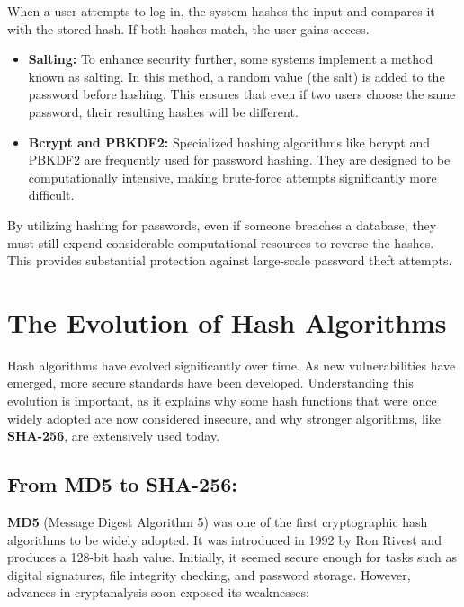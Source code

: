 \documentclass[11pt,a4paper]{article}
\begin{document}
    When a user attempts to log in, the system hashes the input and compares it with the stored hash. If both hashes match, the user gains access.
        \begin{itemize}
            \item \textbf{Salting:} To enhance security further, some systems implement a method known as salting. In this method, a random value (the salt) is added to the password before hashing. This ensures that even if two users choose the same password, their resulting hashes will be different.

            \item \textbf{Bcrypt and PBKDF2:} Specialized hashing algorithms like bcrypt and PBKDF2 are frequently used for password hashing. They are designed to be computationally intensive, making brute-force attempts significantly more difficult.

        \end{itemize}
        By utilizing hashing for passwords, even if someone breaches a database, they must still expend considerable computational resources to reverse the hashes. This provides substantial protection against large-scale password theft attempts.

\section*{The Evolution of Hash Algorithms}
Hash algorithms have evolved significantly over time. As new vulnerabilities have emerged, more secure standards have been developed. Understanding this evolution is important, as it explains why some hash functions that were once widely adopted are now considered insecure, and why stronger algorithms, like \textbf{SHA-256}, are extensively used today.

    \subsection*{From MD5 to SHA-256:}
    \textbf{MD5} (Message Digest Algorithm 5) was one of the first cryptographic hash algorithms to be widely adopted. It was introduced in 1992 by Ron Rivest and produces a 128-bit hash value. Initially, it seemed secure enough for tasks such as digital signatures, file integrity checking, and password storage. However, advances in cryptanalysis soon exposed its weaknesses:
\end{document}
